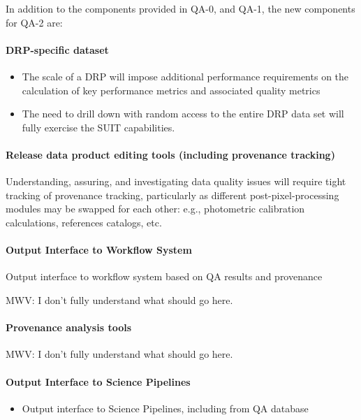 In addition to the components provided in QA-0, and QA-1, the new components for QA-2 are:

\paragraph{DRP-specific dataset}
\label{sec:qaDrpDataset}
\begin{itemize}
\item The scale of a DRP will impose additional performance requirements on the calculation of key performance metrics and associated quality metrics
\item The need to drill down with random access to the entire DRP data set will fully exercise the SUIT capabilities.
\end{itemize}


\paragraph{Release data product editing tools (including provenance tracking)}
\label{sec:qaDrpProvenance}
Understanding, assuring, and investigating data quality issues will require tight tracking of provenance tracking, particularly as different post-pixel-processing modules may be swapped for each other: e.g., photometric calibration calculations, references catalogs, etc.


\paragraph{Output Interface to Workflow System}
\label{sec:qaOutputInterfaceWorkflowSystem}

Output interface to workflow system based on QA results and provenance

MWV: I don't fully understand what should go here.


\paragraph{Provenance analysis tools}
\label{sec:qaProvenanceAnalysis}

MWV: I don't fully understand what should go here.

\paragraph{Output Interface to Science Pipelines}
\label{sec:qaOutputInterfaceSciencePipelines}
\begin{itemize}
\item Output interface to Science Pipelines, including from QA database
\end{itemize}

